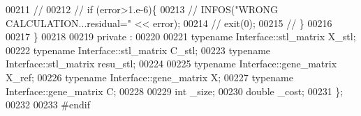\begin{DoxyCode}
00211 \textcolor{comment}{//}
00212 \textcolor{comment}{//     if (error>1.e-6)\{}
00213 \textcolor{comment}{//       INFOS("WRONG CALCULATION...residual=" << error);}
00214 \textcolor{comment}{//       exit(0);}
00215 \textcolor{comment}{//     \}}
00216 
00217   \}
00218 
00219 private :
00220 
00221   \textcolor{keyword}{typename} Interface::stl\_matrix X\_stl;
00222   \textcolor{keyword}{typename} Interface::stl\_matrix C\_stl;
00223   \textcolor{keyword}{typename} Interface::stl\_matrix resu\_stl;
00224 
00225   \textcolor{keyword}{typename} Interface::gene\_matrix X\_ref;
00226   \textcolor{keyword}{typename} Interface::gene\_matrix X;
00227   \textcolor{keyword}{typename} Interface::gene\_matrix C;
00228 
00229   \textcolor{keywordtype}{int} \_size;
00230   \textcolor{keywordtype}{double} \_cost;
00231 \};
00232 
00233 \textcolor{preprocessor}{#endif}
\end{DoxyCode}
